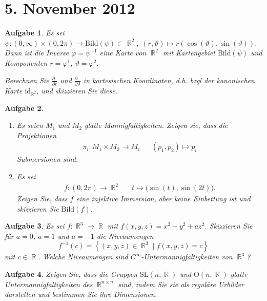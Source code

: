 \documentclass[paper=A4, twoside, chapterprefix=true, bibliography=totoc, headsepline]{scrbook}
\let\temp\phi
\let\phi\varphi
\let\varphi\temp
\let\temp\theta
\let\theta\vartheta
\let\vartheta\temp
\let\temp\epsilon
\let\epsilon\varepsilon
\let\varepsilon\temp
\let\temp\rho
\let\rho\varrho
\let\varrho\temp
\DeclareMathOperator{\R}{\mathbb{R}}
\theoremstyle{plain}
\theoremstyle{nonumberplain}
\theoremstyle{empty}
\theoremstyle{break}
\newtheorem{Aufg}{Aufgabe}
\begin{document}

\section{5. November 2012}
\setcounter{Aufg}{0} %
\setcounter{Loes}{0}

\begin{Aufg}
Es sei $\psi: (0,\infty)\times (0,2\pi)\to \mathrm{Bild}(\psi)\subset \R^2, \;(r,\theta) \mapsto r (\cos(\theta),\sin(\theta))$. Dann ist die Inverse $\phi=\psi^{-1}$ eine Karte von $\R^2$ mit Kartengebiet $\mathrm{Bild}(\psi)$ und Komponenten $r=\phi^1$, $\theta=\phi^2$.

Berechnen Sie $\frac{\partial\phantom{r}}{\partial r}$ und $\frac{\partial \phantom{\theta}}{\partial \theta}$ in kartesischen Koordinaten, d.h. bzgl der kanonischen Karte $\mathrm{id}_{\R^2}$, und skizzieren Sie diese.
\end{Aufg}

\begin{Aufg}\begin{enumerate}[label=\alph*),leftmargin=*,widest=b]
\item
	Es seien $M_1$ und $M_2$ glatte Mannigfaltigkeiten. Zeigen sie, dass die Projektionen
	\begin{align*}
		\pi_i:M_1 \times M_2 \to M_i && (p_1,p_2)\mapsto p_i
	\end{align*}
	Submersionen sind.
\item
	Es sei
	\begin{align*}
		f:(0,2\pi) \to \R^2 && t \mapsto \big(\sin(t),\sin(2t)\big).
	\end{align*}
	Zeigen Sie, dass $f$ eine injektive Immersion, aber keine Einbettung ist und skizzieren Sie $\mathrm{Bild}(f)$.
\end{enumerate}\end{Aufg}

\begin{Aufg}
Es sei $f:\R^3 \to \R$ mit $f(x,y,z) = x^2 +y^2 +a z^2$. Skizzieren Sie für $a=0$, $a=1$ und $a=-1$ die Niveaumengen
	\[f^{-1}(c) =\left\{(x,y,z) \in \R^3 \mid f(x,y,z) =c\right\}\]
mit $c\in \R$. Welche Niveaumengen sind $C^\infty$-Untermannigfaltigkeiten von $\R^3$?
\end{Aufg}

\begin{Aufg}
Zeigen Sie, dass die Gruppen $\mathrm{SL}(n,\R)$ und $\mathrm{O}(n,\R)$ glatte Untermannigfaltigkeiten des $\R^{n\times n}$ sind, indem Sie sie als reguläre Urbilder darstellen und bestimmen Sie ihre Dimensionen.
\end{Aufg}
\end{document}
